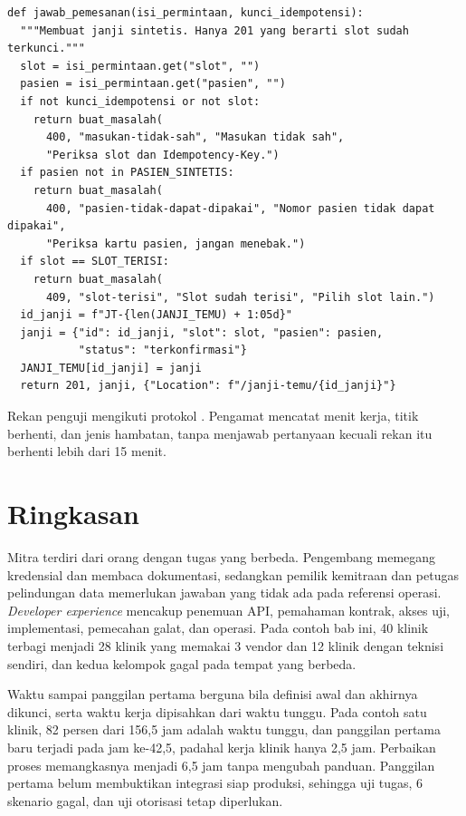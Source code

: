 \begin{pendalaman}[title={Pendalaman Teknis (opsional): Dokumentasi dari Kontrak dan Sandbox Lokal}]
\begin{lstlisting}[style=ch11python, caption={Bagian pemesanan pada \textit{sandbox} lokal, tersedia di \berkas{sources/chapter11/sandbox-api-01.py}}, label={lst:ch11-sandbox}]
def jawab_pemesanan(isi_permintaan, kunci_idempotensi):
  """Membuat janji sintetis. Hanya 201 yang berarti slot sudah terkunci."""
  slot = isi_permintaan.get("slot", "")
  pasien = isi_permintaan.get("pasien", "")
  if not kunci_idempotensi or not slot:
    return buat_masalah(
      400, "masukan-tidak-sah", "Masukan tidak sah",
      "Periksa slot dan Idempotency-Key.")
  if pasien not in PASIEN_SINTETIS:
    return buat_masalah(
      400, "pasien-tidak-dapat-dipakai", "Nomor pasien tidak dapat dipakai",
      "Periksa kartu pasien, jangan menebak.")
  if slot == SLOT_TERISI:
    return buat_masalah(
      409, "slot-terisi", "Slot sudah terisi", "Pilih slot lain.")
  id_janji = f"JT-{len(JANJI_TEMU) + 1:05d}"
  janji = {"id": id_janji, "slot": slot, "pasien": pasien,
           "status": "terkonfirmasi"}
  JANJI_TEMU[id_janji] = janji
  return 201, janji, {"Location": f"/janji-temu/{id_janji}"}
\end{lstlisting}

Rekan penguji mengikuti protokol . Pengamat mencatat menit kerja, titik berhenti, dan jenis hambatan,
tanpa menjawab pertanyaan kecuali rekan itu berhenti lebih dari 15 menit.
\end{pendalaman}

\section{Ringkasan}

Mitra terdiri dari orang dengan tugas yang berbeda. Pengembang memegang kredensial dan membaca dokumentasi, sedangkan pemilik kemitraan dan petugas pelindungan data
memerlukan jawaban yang tidak ada pada referensi operasi. \textit{Developer experience} mencakup penemuan API, pemahaman kontrak, akses uji, implementasi, pemecahan
galat, dan operasi. Pada contoh bab ini, 40 klinik terbagi menjadi 28 klinik yang memakai 3 vendor dan 12 klinik dengan teknisi sendiri, dan kedua kelompok gagal pada
tempat yang berbeda.

Waktu sampai panggilan pertama berguna bila definisi awal dan akhirnya dikunci, serta waktu kerja dipisahkan dari waktu tunggu. Pada contoh satu klinik, 82 persen dari
156,5 jam adalah waktu tunggu, dan panggilan pertama baru terjadi pada jam ke-42,5, padahal kerja klinik hanya 2,5 jam. Perbaikan proses memangkasnya menjadi 6,5 jam
tanpa mengubah panduan. Panggilan pertama belum membuktikan integrasi siap produksi, sehingga uji tugas, 6 skenario gagal, dan uji otorisasi tetap diperlukan.

